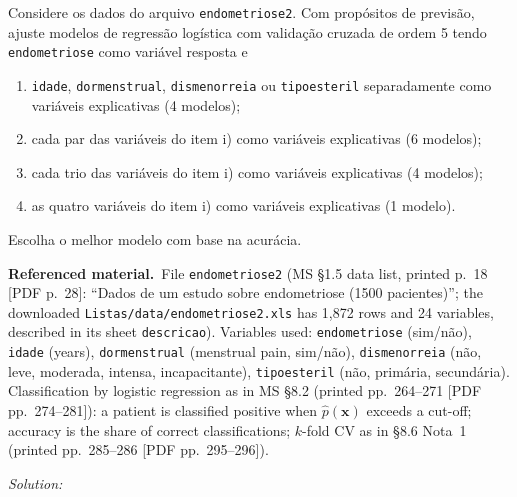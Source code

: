 \documentclass[11pt,a4paper]{article}
\newif\ifsolucoes
\newcommand{\espacoresol}{3.5cm}   %
\numberwithin{equation}{questao}   %
\newenvironment{refmat}{\par\smallskip\noindent\begin{small}\textbf{Referenced material.}\ }{\end{small}\par\smallskip}
\newcommand{\resolespaco}{\ifsolucoes\else\par\textit{Solution:}\vspace{\espacoresol}\par\fi}
\begin{document}
Considere os dados do arquivo \texttt{endometriose2}. Com propósitos de previsão, ajuste modelos de
regressão logística com validação cruzada de ordem 5 tendo \texttt{endometriose} como variável
resposta e
\begin{enumerate}[label=\roman*)]
\item \texttt{idade}, \texttt{dormenstrual}, \texttt{dismenorreia} ou \texttt{tipoesteril} separadamente
como variáveis explicativas (4 modelos);
\item cada par das variáveis do item i) como variáveis explicativas (6 modelos);
\item cada trio das variáveis do item i) como variáveis explicativas (4 modelos);
\item as quatro variáveis do item i) como variáveis explicativas (1 modelo).
\end{enumerate}
Escolha o melhor modelo com base na acurácia.
\begin{refmat}File \texttt{endometriose2} (MS §1.5 data list, printed p.~18 [PDF p.~28]: ``Dados de um
estudo sobre endometriose (1500 pacientes)''; the downloaded \texttt{Listas/data/endometriose2.xls} has
1,872 rows and 24 variables, described in its sheet \texttt{descricao}). Variables used:
\texttt{endometriose} (sim/não), \texttt{idade} (years), \texttt{dormenstrual} (menstrual pain, sim/não),
\texttt{dismenorreia} (não, leve, moderada, intensa, incapacitante), \texttt{tipoesteril} (não, primária,
secundária). Classification by logistic regression as in MS §8.2 (printed pp.~264--271 [PDF
pp.~274--281]): a patient is classified positive when $\hat p(\mathbf x)$ exceeds a cut-off; accuracy is
the share of correct classifications; $k$-fold CV as in §8.6 Nota~1 (printed pp.~285--286 [PDF
pp.~295--296]).\end{refmat}
\resolespaco
\end{document}
